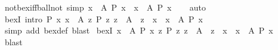 \begin{isabellebody}
\ not{\isacharunderscore}{\kern0pt}bex{\isacharunderscore}{\kern0pt}iff{\isacharunderscore}{\kern0pt}ball{\isacharunderscore}{\kern0pt}not\ {\isacharbrackleft}{\kern0pt}simp{\isacharbrackright}{\kern0pt}{\isacharcolon}{\kern0pt}\ {\isachardoublequoteopen}{\isacharparenleft}{\kern0pt}{\isasymnot}{\isacharparenleft}{\kern0pt}{\isasymexists}x\ {\isasymin}\ A{\isachardot}{\kern0pt}\ P\ x{\isacharparenright}{\kern0pt}{\isacharparenright}{\kern0pt}\ {\isasymlongleftrightarrow}\ {\isacharparenleft}{\kern0pt}{\isasymforall}x\ {\isasymin}\ A{\isachardot}{\kern0pt}\ {\isasymnot}P\ x{\isacharparenright}{\kern0pt}{\isachardoublequoteclose}\isanewline
%
\isadelimproof
\ \ %
\endisadelimproof
%
\isatagproof
{}\isamarkupfalse%
\ auto%
\endisatagproof
{\isafoldproof}%
%
\isadelimproof
\isanewline
%
\endisadelimproof
\isanewline
{}\isamarkupfalse%
\ bex{}I\ {\isacharbrackleft}{\kern0pt}intro{\isacharbrackright}{\kern0pt}{\isacharcolon}{\kern0pt}\ {\isachardoublequoteopen}{\isasymlbrakk}P\ x{\isacharsemicolon}{\kern0pt}\ x\ {\isasymin}\ A{\isacharsemicolon}{\kern0pt}\ {\isasymAnd}z{\isachardot}{\kern0pt}\ {\isasymlbrakk}P\ z{\isacharsemicolon}{\kern0pt}\ z\ {\isasymin}\ A{\isasymrbrakk}\ {\isasymLongrightarrow}\ z\ {\isacharequal}{\kern0pt}\ x{\isasymrbrakk}\ {\isasymLongrightarrow}\ {\isasymexists}{\isacharbang}{\kern0pt}x\ {\isasymin}\ A{\isachardot}{\kern0pt}\ P\ x{\isachardoublequoteclose}\isanewline
%
\isadelimproof
\ \ %
\endisadelimproof
%
\isatagproof
{}\isamarkupfalse%
\ {\isacharparenleft}{\kern0pt}simp\ add{\isacharcolon}{\kern0pt}\ bex{}{\isacharunderscore}{\kern0pt}def{\isacharcomma}{\kern0pt}\ blast{\isacharparenright}{\kern0pt}%
\endisatagproof
{\isafoldproof}%
%
\isadelimproof
\isanewline
%
\endisadelimproof
\isanewline
{}\isamarkupfalse%
\ bex{}I{\isacharprime}{\kern0pt}{\isacharcolon}{\kern0pt}\ {\isachardoublequoteopen}{\isasymlbrakk}x\ {\isasymin}\ A{\isacharsemicolon}{\kern0pt}\ P\ x{\isacharsemicolon}{\kern0pt}\ {\isasymAnd}z{\isachardot}{\kern0pt}\ {\isasymlbrakk}P\ z{\isacharsemicolon}{\kern0pt}\ z\ {\isasymin}\ A{\isasymrbrakk}\ {\isasymLongrightarrow}\ z\ {\isacharequal}{\kern0pt}\ x{\isasymrbrakk}\ {\isasymLongrightarrow}\ {\isasymexists}{\isacharbang}{\kern0pt}x\ {\isasymin}\ A{\isachardot}{\kern0pt}\ P\ x{\isachardoublequoteclose}\isanewline
%
\isadelimproof
\ \ %
\endisadelimproof
%
\isatagproof
{}\isamarkupfalse%
\ blast%
\endisatagproof
{\isafoldproof}%
%
\isadelimproof
\isanewline
%
\endisadelimproof
\isanewline
{}\isamarkupfalse%

\end{isabellebody}
